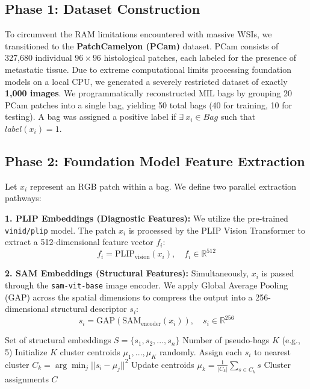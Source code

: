 \documentclass[12pt, a4paper]{article}
\begin{document}
\subsection{Phase 1: Dataset Construction}
To circumvent the RAM limitations encountered with massive WSIs, we transitioned to the \textbf{PatchCamelyon (PCam)} dataset. PCam consists of 327,680 individual $96 \times 96$ histological patches, each labeled for the presence of metastatic tissue. 
Due to extreme computational limits processing foundation models on a local CPU, we generated a severely restricted dataset of exactly \textbf{1,000 images}. We programmatically reconstructed MIL bags by grouping 20 PCam patches into a single bag, yielding 50 total bags (40 for training, 10 for testing). A bag was assigned a positive label if $\exists\ x_i \in Bag$ such that $label(x_i) = 1$. 

\subsection{Phase 2: Foundation Model Feature Extraction}
Let $x_i$ represent an RGB patch within a bag. We define two parallel extraction pathways:

\textbf{1. PLIP Embeddings (Diagnostic Features):}
We utilize the pre-trained \texttt{vinid/plip} model. The patch $x_i$ is processed by the PLIP Vision Transformer to extract a 512-dimensional feature vector $f_i$:
\begin{equation}
f_i = \text{PLIP}_{\text{vision}}(x_i), \quad f_i \in \mathbb{R}^{512}
\end{equation}

\textbf{2. SAM Embeddings (Structural Features):}
Simultaneously, $x_i$ is passed through the \texttt{sam-vit-base} image encoder. We apply Global Average Pooling (GAP) across the spatial dimensions to compress the output into a 256-dimensional structural descriptor $s_i$:
\begin{equation}
s_i = \text{GAP}(\text{SAM}_{\text{encoder}}(x_i)), \quad s_i \in \mathbb{R}^{256}
\end{equation}

\begin{algorithm}
\caption{Semantic Pseudo-Bag Generation}
\begin{algorithmic}[1]
\REQUIRE Set of structural embeddings $S = \{s_1, s_2, ..., s_n\}$
\REQUIRE Number of pseudo-bags $K$ (e.g., 5)
\STATE Initialize $K$ cluster centroids $\mu_1, ..., \mu_K$ randomly.
    \STATE Assign each $s_i$ to nearest cluster $C_k = \arg\min_j ||s_i - \mu_j||^2$
    \STATE Update centroids $\mu_k = \frac{1}{|C_k|} \sum_{s \in C_k} s$
\ENDWHILE
\RETURN Cluster assignments $C$
\end{algorithmic}
\end{algorithm}
\end{document}
